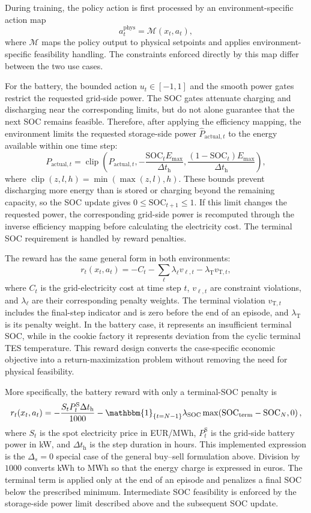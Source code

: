 \documentclass[12pt]{article}
\begin{document}
During training, the policy action is first processed by an environment-specific action map
\[
a_t^{\mathrm{phys}} = \mathcal{M}(x_t,a_t),
\]
where $\mathcal{M}$ maps the policy output to physical setpoints and applies environment-specific feasibility handling. The constraints enforced directly by this map differ between the two use cases.

For the battery, the bounded action $u_t\in[-1,1]$ and the smooth power gates restrict the requested grid-side power. The SOC gates attenuate charging and discharging near the corresponding limits, but do not alone guarantee that the next SOC remains feasible. Therefore, after applying the efficiency mapping, the environment limits the requested storage-side power $\widehat P_{\mathrm{actual},t}$ to the energy available within one time step:
\[
P_{\mathrm{actual},t}
=\operatorname{clip}\!\left(
\widehat P_{\mathrm{actual},t},
-\frac{\mathrm{SOC}_t E_{\max}}{\Delta t_{\mathrm h}},
\frac{(1-\mathrm{SOC}_t)E_{\max}}{\Delta t_{\mathrm h}}
\right),
\]
where $\operatorname{clip}(z,l,h)=\min(\max(z,l),h)$. These bounds prevent discharging more energy than is stored or charging beyond the remaining capacity, so the SOC update gives $0\leq\mathrm{SOC}_{t+1}\leq1$. If this limit changes the requested power, the corresponding grid-side power is recomputed through the inverse efficiency mapping before calculating the electricity cost. The terminal SOC requirement is handled by reward penalties.

The reward has the same general form in both environments:
\[
r_t(x_t,a_t) = -C_t - \sum_{\ell} \lambda_\ell v_{\ell,t} - \lambda_{\mathrm{T}} v_{\mathrm{T},t},
\]
where $C_t$ is the grid-electricity cost at time step $t$, $v_{\ell,t}$ are constraint violations, and $\lambda_\ell$ are their corresponding penalty weights. The terminal violation $v_{\mathrm{T},t}$ includes the final-step indicator and is zero before the end of an episode, and $\lambda_{\mathrm{T}}$ is its penalty weight. In the battery case, it represents an insufficient terminal SOC, while in the cookie factory it represents deviation from the cyclic terminal TES temperature. This reward design converts the case-specific economic objective into a return-maximization problem without removing the need for physical feasibility.

More specifically, the battery reward with only a terminal-SOC penalty is
\[
r_t(x_t,a_t) = -\frac{S_t P_t^{\mathrm S}\Delta t_{\mathrm h}}{1000}
-\mathbbm{1}_{\{t=N-1\}}\lambda_{\mathrm{SOC}}
\max\!\left(\mathrm{SOC}_{\mathrm{term}}-\mathrm{SOC}_N,0\right),
\]
where $S_t$ is the spot electricity price in EUR/MWh, $P_t^{\mathrm S}$ is the grid-side battery power in kW, and $\Delta t_{\mathrm h}$ is the step duration in hours. This implemented expression is the $\Delta_s=0$ special case of the general buy--sell formulation above. Division by $1000$ converts kWh to MWh so that the energy charge is expressed in euros. The terminal term is applied only at the end of an episode and penalizes a final SOC below the prescribed minimum. Intermediate SOC feasibility is enforced by the storage-side power limit described above and the subsequent SOC update.
\end{document}
